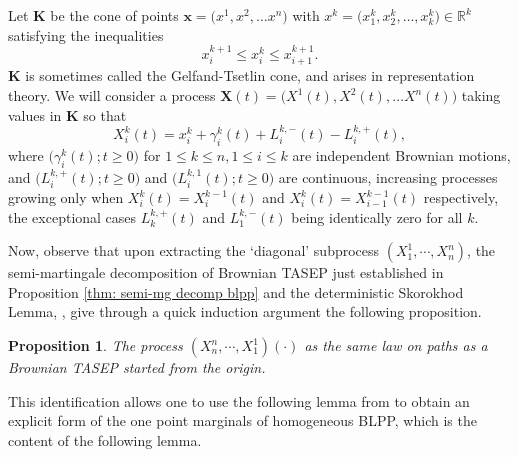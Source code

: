\documentclass[11pt, reqno]{amsart}
\numberwithin{equation}{section}
\newcounter{dummy} \numberwithin{dummy}{section}
\newtheorem{proposition}[dummy]{Proposition}
\newcommand{\R}{\ensuremath{\mathbb{R}}}
\begin{document}
Let ${\mathbf K}$ be the cone of  points ${\mathbf x}= 
\bigl(x^{1},x^{2}, \ldots x^{n}\bigr)$ with  $x^{k}=\bigl(x^{k}_1,x^{k}_2, \ldots ,x^{k}_k\bigr) \in {\R}^k$ satisfying 
the inequalities 
\begin{equation*}
 x^{k+1}_{i} \leq x^{k}_i \leq x^{k+1}_{i+1}.
\end{equation*}
${\mathbf K}$ is sometimes called the Gelfand-Tsetlin cone, and arises in representation theory.
We will consider a process ${\mathbf X}(t)=\bigl( X^{1}(t), X^{2}(t), \ldots X^{n}(t)\bigr)$ taking values in ${\mathbf K}$ so that 
\begin{equation*}
\label{gts:sde}
X^{k}_i(t)= x^{k}_i+\gamma^{k}_i(t)+ L^{k,-}_i(t)-L^{k,+}_i(t),
\end{equation*}
where $\bigl(\gamma^k_i(t); t \geq 0 \bigr)$ for $1\leq k \leq n, 1 \leq i \leq k $ are independent Brownian motions, and 
$\bigl(L^{k,+}_i(t); t \geq 0 \bigr)$ and  $\bigl(L^{k,1}_i(t); t \geq 0 \bigr)$ are continuous, increasing processes growing only when 
$X^k_i(t)=X^{k-1}_i(t)$ and $X^k_i(t)=X^{k-1}_{i-1}(t)$ respectively,  the exceptional cases  $L^{k,+}_k(t)$ and $L^{k,-}_1(t)$  being 
identically zero for all $k$.

Now, observe that upon extracting the `diagonal' subprocess $(X^1_1, \cdots, X^n_n)$, the semi-martingale decomposition of Brownian TASEP just established in Proposition \ref{thm: semi-mg decomp blpp} and the deterministic Skorokhod Lemma, \cite[Lemma 2.1]{revuz2013continuous}, give through a quick induction argument the following proposition. 

\begin{proposition}\label{prop: interlacing inhm blpp equality}
The process $(X^n_n, \cdots, X^1_1)(\cdot)$ as the same law on paths as a Brownian TASEP started from the origin.
\end{proposition}

This identification allows one to use the following lemma from \cite{warren2007dyson} to obtain an explicit form of the one point marginals of homogeneous BLPP, which is the content of the following lemma.
\end{document}
